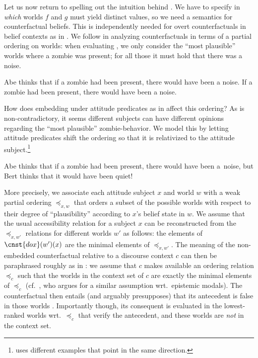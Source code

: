 \documentclass[output=paper]{langscibook}
\begin{document}
\noindent Let us now return to spelling out the intuition behind . We have to specify in \textit{which} worlds $f$ and $g$ must yield distinct values, so we need a semantics for counterfactual beliefs. This is independently needed for overt counterfactuals in belief contexts as in . We follow \citet{Lewis:1973} in analyzing counterfactuals in terms of a partial ordering on worlds: when evaluating , we only consider the ``most plausible''  worlds where a zombie was present; for all those it must hold that there was a noise.

\eanoraggedright
\eanoraggedright \label{sch-has:ex:38} Abe thinks that if a zombie had been present, there would have been a noise. 
\ex \label{sch-has:ex:39} If a zombie had been present, there would have been a noise. \z\z

\noindent How does embedding under attitude predicates as in  affect this ordering?  As  is non-contradictory, it seems different subjects can have different opinions regarding the ``most plausible'' zombie-behavior. We model this by letting attitude predicates shift the ordering so that it is relativized to the attitude subject.\footnote{\citet{Arregui:2008} uses different examples that point in the same direction.}

\ea \label{sch-has:ex:40} Abe thinks that if a zombie had been present, there would have been a~noise, but Bert thinks that it would have been quiet!\z

\noindent More precisely, we associate each attitude subject $x$ and world $w$ with a weak partial ordering $\preceq_{x, w}$ that orders a subset of the possible worlds with respect to their degree of ``plausibility'' according to $x$'s belief state in $w$. We assume that the usual accessibility relation for a subject $x$ can be reconstructed from the $\preceq_{x, w'}$ relations for different worlds $w'$ as follows: the elements of $\cnst{dox}(w')(x)$ are the minimal elements of $\preceq_{x, w'}$. The meaning of the non-embedded counterfactual  relative to a discourse context $c$ can then be paraphrased roughly as in : we assume that $c$ makes available an ordering relation $\preceq_c$ such that the worlds in the context set of $c$ are exactly the minimal elements of $\preceq_c$ (cf.~\citealt{Yalcin:2007}, who argues for a similar assumption wrt.~epistemic modals). The counterfactual then entails (and arguably presupposes) that its antecedent is false in those worlds . Importantly though, its consequent is evaluated in the lowest-ranked worlds wrt.~$\preceq_c$ that verify the antecedent, and these worlds are \textit{not} in the context set. 
\end{document}
